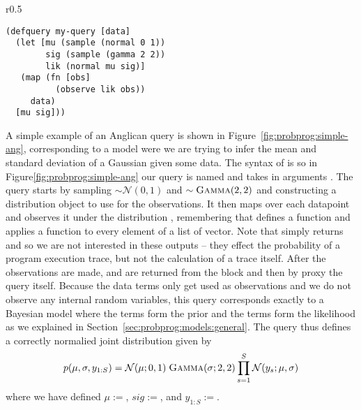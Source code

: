 \begin{wrapfigure}{r}{0.5\textwidth}
	\centering 
	\begin{lstlisting}[basicstyle=\ttfamily\small]
(defquery my-query [data]
  (let [mu (sample (normal 0 1))
        sig (sample (gamma 2 2))
        lik (normal mu sig)]
   (map (fn [obs]
          (observe lik obs))
     data)
  [mu sig]))
	\end{lstlisting}	
	\vspace{-5pt}
	\caption{A simple Anglican query.\label{fig:probprog:simple-ang}}
	\vspace{-10pt}
\end{wrapfigure}
A simple example of an Anglican query is shown in Figure~\ref{fig:probprog:simple-ang},
corresponding to a model were we are trying to infer the mean and standard deviation
of a Gaussian given some data.  The syntax of  is {\small {}}
so in Figure\ref{fig:probprog:simple-ang} our query is named {\small {}} and takes
in arguments {\small {}}.  The query starts by sampling {\small {}}$\sim\mathcal{N}(0,1)$
and {\small {}}$\sim\textsc{Gamma}(2,2)$ and constructing a distribution object {\small {}}
to use for the observations.  It then maps over each datapoint and observes it under the distribution
{\small {}}, remembering that {\small {}} defines a function and \map applies a function
to every element of a list of vector.  
Note that \observe simply returns {\small {}} and so we
are not interested in these outputs -- they effect the probability of a program execution trace, but
not the calculation of a trace itself.  After the observations are made, {\small {}} and {\small {}}
are returned from the \cllet block and then by proxy the query itself.
Because the data terms only get used as observations and we do
not observe any internal random variables, this query corresponds exactly to a Bayesian model where
the \sample terms form the prior and the \observe terms form the likelihood as we explained in
Section~\ref{sec:probprog:models:general}.  The query thus defines a correctly normalied joint
distribution given by
\begin{align}
p(\mu,\sigma,y_{1:S}) = \mathcal{N}(\mu ; 0,1) \; \textsc{Gamma}(\sigma ; 2, 2) \prod_{s=1}^{S} \mathcal{N}(y_s ; \mu, \sigma)
\end{align}
where we have defined $\mu:=${\small {}}, $sig:=${\small {}}, and $y_{1:S}:=${\small {}}.

